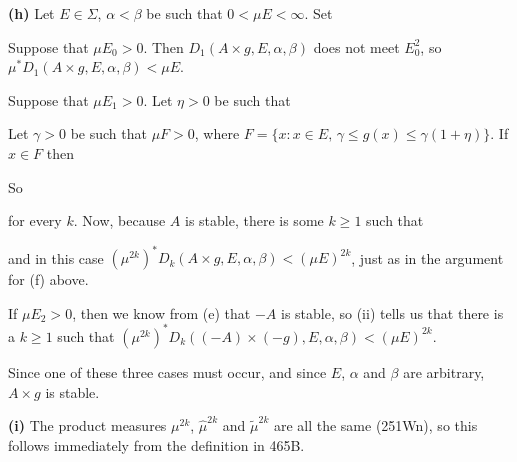 {\medskip

{\bf (h)} Let $E\in\Sigma$, $\alpha<\beta$ be such that
$0<\mu E<\infty$.   Set



\medskip

 Suppose that $\mu E_0>0$.   Then
$D_1(A\times g,E,\alpha,\beta)$ does not meet $E_0^2$, so
$\mu^*D_1(A\times g,E,\alpha,\beta)<\mu E$.

\medskip

 Suppose that $\mu E_1>0$.   Let $\eta>0$ be such that


\noindent Let $\gamma>0$ be such that $\mu F>0$, where
$F=\{x:x\in E,\,\gamma\le g(x)\le\gamma(1+\eta)\}$.   If $x\in F$ then



\noindent So


\noindent for every $k$.   Now, because $A$ is stable, there is some
$k\ge 1$ such that


\noindent and in this case
$(\mu^{2k})^*D_k(A\times g,E,\alpha,\beta)<(\mu E)^{2k}$, just as in the
argument for (f) above.

\medskip

 If $\mu E_2>0$, then we know from (e) that $-A$ is
stable, so (ii) tells us that
there is a $k\ge 1$ such that
$(\mu^{2k})^*D_k((-A)\times(-g),E,\alpha,\beta)<(\mu E)^{2k}$.

Since one of these three cases must occur, and since $E$, $\alpha$ and
$\beta$ are arbitrary, $A\times g$ is stable.

\medskip

{\bf (i)} The product measures $\mu^{2k}$, $\hat\mu^{2k}$ and
$\tilde\mu^{2k}$ are all the same (251Wn), so this follows immediately
from the definition in 465B.

}
